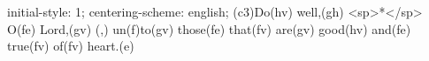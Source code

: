 initial-style: 1;
centering-scheme: english;
(c3)Do(hv) well,(gh) <sp>*</sp> O(fe) Lord,(gv) (,) un(f)to(gv) those(fe) that(fv) are(gv) good(hv) and(fe) true(fv) of(fv) heart.(e)
